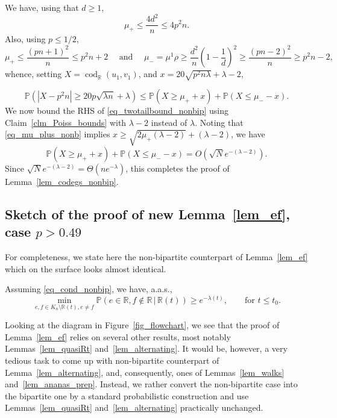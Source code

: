 \documentclass[12pt,reqno]{amsart}
\newcommand{\Prob} {\mathbb {P}}
\newcommand{\prob}[1]{\Prob\left(#1\right)}
\newcommand{\Pc}[2]{\prob{#1\,|\,#2}}
\newcommand{\R} {\mathbb R}
\newcommand{\cod}{\operatorname{cod}}
\theoremstyle{definition}
\newenvironment{manuallemma}[1]{%
  \renewcommand\themanuallemmainner{#1}%
  \manuallemmainner
}
{
\endmanuallemmainner
}
\newcommand{\rhs}{RHS}
\begin{document}
We have, using that $d \ge 1$,
\begin{equation}
\label{eq_mu_plus_nonb}
   \mu_+ \le \frac{4d^2}{n} \le 4p^2n.
\end{equation}
Also, using $p \le 1/2$,
\begin{equation*}
  \mu_+\le \frac{(pn+1)^2}n\le p^2n+2 \quad \text{ and } \quad \mu_-=\mu^1\rho\ge\frac{d^2}n\left(1-\frac1d\right)^2\ge\frac{(pn-2)^2}n\ge p^2n-2,
\end{equation*}
whence, setting $X = \cod_{\R}(u_1,v_1)$, and $x = 20\sqrt{p^2 n \lambda} + \lambda - 2$,

\begin{equation}
\label{eq_twotailbound_nonbip}
    \prob{|X - p^2n| \ge 20p\sqrt{\lambda n} + \lambda} \le \prob{X \ge \mu_+ + x} + \prob{X\le \mu_- - x}.
  \end{equation}
We now bound the \rhs{} of \eqref{eq_twotailbound_nonbip} using Claim~\ref{clm_Poiss_bounds} with $\lambda - 2$ instead of $\lambda$. Noting that \eqref{eq_mu_plus_nonb} implies $x \ge \sqrt{2 \mu_+ (\lambda - 2)} + (\lambda - 2)$, we have
\begin{equation*}
     \prob{X \ge \mu_+ + x} + \prob{X\le \mu_- - x} = O\left( \sqrt{N} e^{-(\lambda - 2)} \right).
\end{equation*}
Since $\sqrt{N} e^{-(\lambda -2)} = \Theta(n e^{-\lambda})$,
this completes the proof of Lemma~\ref{lem_codegs_nonbip}.



\subsection{Sketch of the proof of new Lemma~\ref{lem_ef}, case \texorpdfstring{$p > 0.49$}{p > 0.49}}
For completeness, we state here the non-bipartite counterpart of Lemma~\ref{lem_ef} which on the surface looks almost identical.

\begin{manuallemma}{\ref{lem_ef}$'$}
  \label{lem_ef_nonbip}
  Assuming \eqref{eq_cond_nonbip}, we have, a.a.s.,
  \begin{equation*}
    \min_{e, f \in K_n \setminus \R(t), e \neq f}\Pc{e \in \R, f \notin \R}{\R(t)} \ge e^{ - \lambda(t) }, \qquad \text{for } t \le t_0.
  \end{equation*}
\end{manuallemma}



Looking at the diagram in Figure~\ref{fig_flowchart}, we see that the proof of Lemma~\ref{lem_ef} relies on several other results, most notably Lemmas~\ref{lem_quasiRt} and~\ref{lem_alternating}.
It would be, however, a very tedious task to come up with non-bipartite counterpart of Lemma~\ref{lem_alternating}, and, consequently, ones of Lemmas~\ref{lem_walks} and~\ref{lem_ananas_prep}. Instead, we rather convert the non-bipartite case into the bipartite one by a standard probabilistic construction and use Lemmas~\ref{lem_quasiRt} and~\ref{lem_alternating} practically unchanged.
\end{document}

